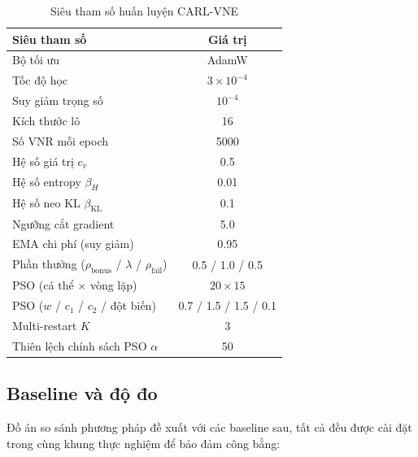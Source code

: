 \documentclass[../DoAn.tex]{subfiles}
\begin{document}
\begin{table}[H]
\centering
\caption{Siêu tham số huấn luyện CARL-VNE}
\label{tab:hyperparams}
\begin{tabular}{lc}
\toprule
\textbf{Siêu tham số} & \textbf{Giá trị} \\
\midrule
Bộ tối ưu & AdamW \\
Tốc độ học & $3\times10^{-4}$ \\
Suy giảm trọng số & $10^{-4}$ \\
Kích thước lô & 16 \\
Số VNR mỗi epoch & 5000 \\
Hệ số giá trị $c_v$ & 0.5 \\
Hệ số entropy $\beta_H$ & 0.01 \\
Hệ số neo KL $\beta_{\text{KL}}$ & 0.1 \\
Ngưỡng cắt gradient & 5.0 \\
EMA chi phí (suy giảm) & 0.95 \\
Phần thưởng ($\rho_{\text{bonus}}$ / $\lambda$ / $\rho_{\text{fail}}$) & 0.5 / 1.0 / 0.5 \\
PSO (cá thể $\times$ vòng lặp) & $20 \times 15$ \\
PSO ($w$ / $c_1$ / $c_2$ / đột biến) & 0.7 / 1.5 / 1.5 / 0.1 \\
Multi-restart $K$ & 3 \\
Thiên lệch chính sách PSO $\alpha$ & 50 \\
\bottomrule
\end{tabular}
\end{table}

\subsection{Baseline và độ đo}
\label{subsec:exp-baseline}

Đồ án so sánh phương pháp đề xuất với các baseline sau, tất cả đều được cài đặt trong cùng khung thực nghiệm để bảo đảm công bằng:
\end{document}

